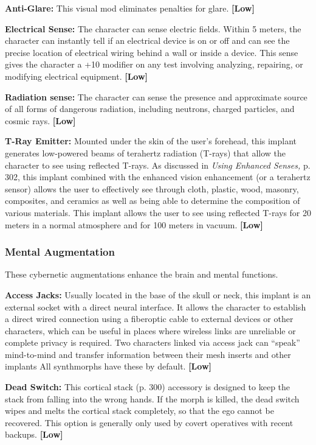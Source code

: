 \textbf{Anti-Glare:} This visual mod eliminates penalties for 
glare. \textbf{[Low]}

\textbf{Electrical Sense:} The character can sense electric 
fields. Within 5 meters, the character can instantly 
tell if an electrical device is on or off and can see the 
precise location of electrical wiring behind a wall or 
inside a device. This sense gives the character a +10 
modifier on any test involving analyzing, repairing, or 
modifying electrical equipment. \textbf{[Low]}

\textbf{Radiation sense:} The character can sense the presence
and approximate source of all forms of dangerous
radiation, including neutrons, charged particles,
and cosmic rays. \textbf{[Low]}

\textbf{T-Ray Emitter:} Mounted under the skin of the 
user's forehead, this implant generates low-powered 
beams of terahertz radiation (T-rays) that allow the 
character to see using reflected T-rays. As discussed in 
\textit{Using Enhanced Senses, }p. 302, this implant combined 
with the enhanced vision enhancement (or a terahertz 
sensor) allows the user to effectively see through cloth, 
plastic, wood, masonry, composites, and ceramics as 
well as being able to determine the composition of 
various materials. This implant allows the user to see 
using reflected T-rays for 20 meters in a normal atmosphere
and for 100 meters in vacuum. \textbf{[Low]}

\subsubsection{Mental Augmentation}

These cybernetic augmentations enhance the brain 
and mental functions.

\textbf{Access Jacks:} Usually located in the base of the skull 
or neck, this implant is an external socket with a direct 
neural interface. It allows the character to establish a 
direct wired connection using a fiberoptic cable to 
external devices or other characters, which can be 
useful in places where wireless links are unreliable or 
complete privacy is required. Two characters linked 
via access jack can ``speak'' mind-to-mind and transfer 
information between their mesh inserts and other implants
All synthmorphs have these by default. \textbf{[Low]}

\textbf{Dead Switch: }This cortical stack (p. 300) accessory is 
designed to keep the stack from falling into the wrong 
hands. If the morph is killed, the dead switch wipes 
and melts the cortical stack completely, so that the ego 
cannot be recovered. This option is generally only used 
by covert operatives with recent backups. \textbf{[Low]}

